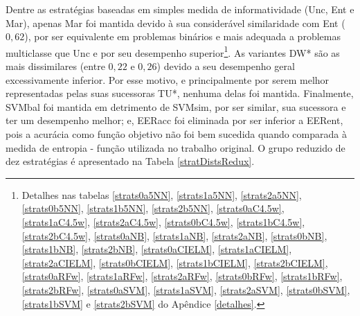 Dentre as estratégias baseadas em simples medida de informatividade
(Unc, Ent e Mar), apenas Mar foi mantida devido
à sua considerável similaridade com Ent ($0,62$),
por ser equivalente em problemas binários e mais adequada a problemas multiclasse que Unc
e por seu desempenho superior\footnote{\label{note1}Detalhes nas tabelas
\ref{strats0a5NN}, \ref{strats1a5NN}, \ref{strats2a5NN},
\ref{strats0b5NN}, \ref{strats1b5NN}, \ref{strats2b5NN},
\ref{strats0aC4.5w}, \ref{strats1aC4.5w}, \ref{strats2aC4.5w},
\ref{strats0bC4.5w}, \ref{strats1bC4.5w}, \ref{strats2bC4.5w},
\ref{strats0aNB}, \ref{strats1aNB}, \ref{strats2aNB},
\ref{strats0bNB}, \ref{strats1bNB}, \ref{strats2bNB},
\ref{strats0aCIELM}, \ref{strats1aCIELM}, \ref{strats2aCIELM},
\ref{strats0bCIELM}, \ref{strats1bCIELM}, \ref{strats2bCIELM},
\ref{strats0aRFw}, \ref{strats1aRFw}, \ref{strats2aRFw},
\ref{strats0bRFw}, \ref{strats1bRFw}, \ref{strats2bRFw},
\ref{strats0aSVM}, \ref{strats1aSVM}, \ref{strats2aSVM},
\ref{strats0bSVM}, \ref{strats1bSVM} e \ref{strats2bSVM}
do Apêndice \ref{detalhes}.}.
As variantes DW* são as mais dissimilares (entre $0,22$ e $0,26$) devido a seu desempenho
geral excessivamente inferior.
Por esse motivo, e principalmente por serem melhor representadas pelas suas sucessoras TU*,
nenhuma delas foi mantida.
Finalmente,
SVMbal foi mantida em detrimento de SVMsim, por ser similar, sua sucessora e ter
um desempenho melhor; e,
EERacc foi eliminada por ser inferior a EERent, pois
a acurácia como função objetivo não foi bem sucedida quando comparada à medida
de entropia - função utilizada no trabalho original.
O grupo reduzido de dez estratégias é apresentado na Tabela \ref{stratDistsRedux}.
